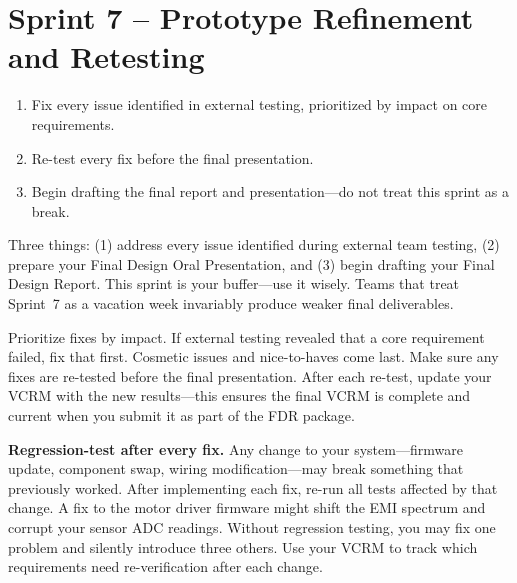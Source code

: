 \section{Sprint 7 -- Prototype Refinement and Retesting}

\begin{priorities}
\begin{enumerate}[leftmargin=*, itemsep=1pt, topsep=0pt]
    \item Fix every issue identified in external testing, prioritized by impact on core requirements.
    \item Re-test every fix before the final presentation.
    \item Begin drafting the final report and presentation---do not treat this sprint as a break.
\end{enumerate}
\end{priorities}

\begin{faqbox}
Three things: (1) address every issue identified during external team testing, (2) prepare your Final Design Oral Presentation, and (3) begin drafting your Final Design Report. This sprint is your buffer---use it wisely. Teams that treat Sprint~7 as a vacation week invariably produce weaker final deliverables.
\end{faqbox}

\begin{tipbox}
Prioritize fixes by impact. If external testing revealed that a core requirement failed, fix that first. Cosmetic issues and nice-to-haves come last. Make sure any fixes are re-tested before the final presentation. After each re-test, update your VCRM with the new results---this ensures the final VCRM is complete and current when you submit it as part of the FDR package.
\end{tipbox}

\begin{warnbox}
\textbf{Regression-test after every fix.} Any change to your system---firmware update, component swap, wiring modification---may break something that previously worked. After implementing each fix, re-run all tests affected by that change. A fix to the motor driver firmware might shift the EMI spectrum and corrupt your sensor ADC readings. Without regression testing, you may fix one problem and silently introduce three others. Use your VCRM to track which requirements need re-verification after each change.
\end{warnbox}

